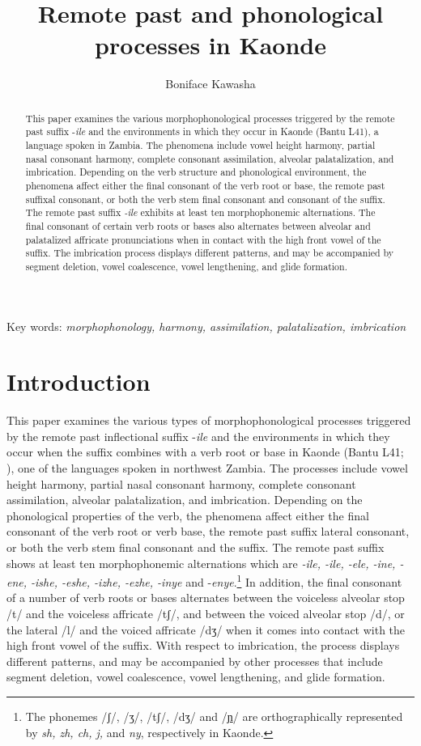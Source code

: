 \documentclass[output=paper]{langsci/langscibook}
\title{Remote past and phonological processes in Kaonde}
\author{%
Boniface Kawasha\affiliation{Savannah State University}
}
\begin{document}
\begin{abstract}
This paper examines the various morphophonological processes triggered by the remote past suffix -\textit{ile} and the environments in which they occur in Kaonde (Bantu L41), a language spoken in Zambia. The phenomena include vowel height harmony, partial nasal consonant harmony, complete consonant assimilation, alveolar palatalization, and imbrication. Depending on the verb structure and phonological environment, the phenomena affect either the final consonant of the verb root or base, the remote past suffixal consonant, or both the verb stem final consonant and consonant of the suffix. The remote past suffix \textit{-ile} exhibits at least ten morphophonemic alternations. The final consonant of certain verb roots or bases also alternates between alveolar and palatalized affricate pronunciations when in contact with the high front vowel of the suffix. The imbrication  process displays different patterns, and may be accompanied by segment deletion, vowel coalescence, vowel lengthening, and glide formation.
\end{abstract}

Key words: \textit{morphophonology, harmony, assimilation, palatalization, imbrication}

\section{Introduction}\label{§1:introduction.kawasha}

This paper examines the various types of morphophonological processes triggered by the remote past inflectional suffix -\textit{ile} and the environments in which they occur when the suffix combines with a verb root or base in Kaonde (Bantu L41; \citealt{guthrie1967}), one of the languages spoken in northwest Zambia. The processes include vowel height harmony, partial nasal consonant harmony, complete consonant assimilation, alveolar palatalization, and imbrication. Depending on the phonological properties of the verb, the phenomena affect either the final consonant of the verb root or verb base, the remote past suffix lateral consonant, or both the verb stem final consonant and the suffix. The remote past suffix shows at least ten morphophonemic alternations which are \textit{-ile, -ile, -ele, -ine, -ene, -ishe, -eshe, -izhe, -ezhe, -inye} and -\textit{enye}.\footnote{The phonemes /ʃ/, /ʒ/, /tʃ/, /dʒ/ and /\href{http://en.wikipedia.org/wiki/Ɲ}{ɲ}/ are orthographically represented by \textit{sh, zh, ch, j,} and \textit{ny}, respectively in Kaonde.} In addition, the final consonant of a number of verb roots or bases alternates between the voiceless alveolar stop /t/ and the voiceless affricate /tʃ/, and between the voiced alveolar stop /d/, or the lateral /l/ and the voiced affricate /dʒ/ when it comes into contact with the high front vowel of the suffix. With respect to imbrication, the process displays different patterns, and may be accompanied by other processes that include segment deletion, vowel coalescence, vowel lengthening, and glide formation.
\end{document}
